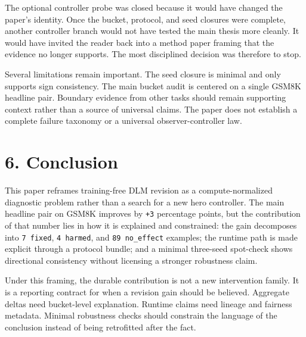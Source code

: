 \documentclass{article}
\begin{document}
The optional controller probe was closed because it would have changed the paper's identity. Once the bucket, protocol, and seed closures were complete, another controller branch would not have tested the main thesis more cleanly. It would have invited the reader back into a method paper framing that the evidence no longer supports. The most disciplined decision was therefore to stop.

Several limitations remain important. The seed closure is minimal and only supports sign consistency. The main bucket audit is centered on a single GSM8K headline pair. Boundary evidence from other tasks should remain supporting context rather than a source of universal claims. The paper does not establish a complete failure taxonomy or a universal observer-controller law.

\section{6. Conclusion}

This paper reframes training-free DLM revision as a compute-normalized diagnostic problem rather than a search for a new hero controller. The main headline pair on GSM8K improves by \texttt{+3} percentage points, but the contribution of that number lies in how it is explained and constrained: the gain decomposes into \texttt{7 fixed}, \texttt{4 harmed}, and \texttt{89 no\_effect} examples; the runtime path is made explicit through a protocol bundle; and a minimal three-seed spot-check shows directional consistency without licensing a stronger robustness claim.

Under this framing, the durable contribution is not a new intervention family. It is a reporting contract for when a revision gain should be believed. Aggregate deltas need bucket-level explanation. Runtime claims need lineage and fairness metadata. Minimal robustness checks should constrain the language of the conclusion instead of being retrofitted after the fact.



\end{document}
